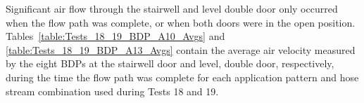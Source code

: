 \documentclass[12pt,oneside]{book}
\begin{document}
\clearpage

Significant air flow through the stairwell and  level double door only occurred when the flow path was complete, or when both doors were in the open position. Tables~\ref{table:Tests_18_19_BDP_A10_Avgs} and \ref{table:Tests_18_19_BDP_A13_Avgs} contain the average air velocity measured by the eight BDPs at the stairwell door and  level, double door, respectively, during the time the flow path was complete for each application pattern and hose stream combination used during Tests 18 and 19.

\end{document}
